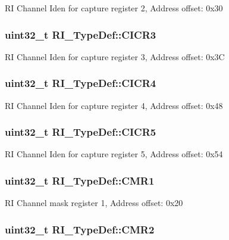R\-I Channel Iden for capture register 2, Address offset\-: 0x30 \hypertarget{struct_r_i___type_def_a19be14627876a809ff22635b08c36c00}{
\subsubsection[{C\-I\-C\-R3}]{ uint32\-\_\-t R\-I\-\_\-\-Type\-Def\-::\-C\-I\-C\-R3}}\label{struct_r_i___type_def_a19be14627876a809ff22635b08c36c00}
R\-I Channel Iden for capture register 3, Address offset\-: 0x3\-C \hypertarget{struct_r_i___type_def_afc3328085320fa08ef3da923ad8de58b}{
\subsubsection[{C\-I\-C\-R4}]{ uint32\-\_\-t R\-I\-\_\-\-Type\-Def\-::\-C\-I\-C\-R4}}\label{struct_r_i___type_def_afc3328085320fa08ef3da923ad8de58b}
R\-I Channel Iden for capture register 4, Address offset\-: 0x48 \hypertarget{struct_r_i___type_def_ae7eaf8edd5c94b81df8de1200a0c66b9}{
\subsubsection[{C\-I\-C\-R5}]{ uint32\-\_\-t R\-I\-\_\-\-Type\-Def\-::\-C\-I\-C\-R5}}\label{struct_r_i___type_def_ae7eaf8edd5c94b81df8de1200a0c66b9}
R\-I Channel Iden for capture register 5, Address offset\-: 0x54 \hypertarget{struct_r_i___type_def_ae81ea65b0b1754359eb5255746373440}{
\subsubsection[{C\-M\-R1}]{ uint32\-\_\-t R\-I\-\_\-\-Type\-Def\-::\-C\-M\-R1}}\label{struct_r_i___type_def_ae81ea65b0b1754359eb5255746373440}
R\-I Channel mask register 1, Address offset\-: 0x20 \hypertarget{struct_r_i___type_def_a404abfb80f04249dbbcd2beffe6565cf}{
\subsubsection[{C\-M\-R2}]{ uint32\-\_\-t R\-I\-\_\-\-Type\-Def\-::\-C\-M\-R2}}\label{struct_r_i___type_def_a404abfb80f04249dbbcd2beffe6565cf}

